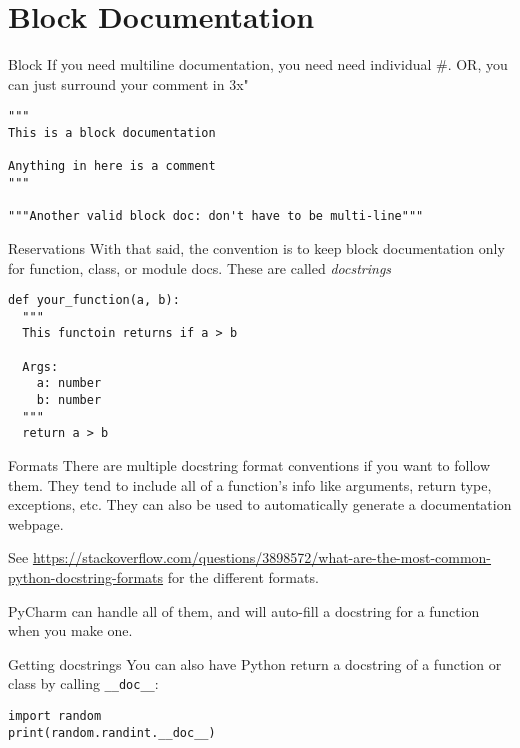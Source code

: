 \section{Block Documentation}
\begin{frame}[containsverbatim]{Block}
If you need multiline documentation, you need need individual \#. OR, you can just surround your comment in 3x"
\begin{verbatim}
"""
This is a block documentation

Anything in here is a comment
"""

"""Another valid block doc: don't have to be multi-line"""
\end{verbatim}
\end{frame}

\begin{frame}[containsverbatim]{Reservations}
With that said, the convention is to keep block documentation only for function, class, or module docs. These are called \textit{docstrings}
\begin{verbatim}
def your_function(a, b):
  """
  This functoin returns if a > b

  Args:
    a: number
    b: number
  """
  return a > b
\end{verbatim}
\end{frame}

\begin{frame}{Formats}
There are multiple docstring format conventions if you want to follow them. They tend to include all of a function's info like arguments, return type, exceptions, etc. They can also be used to automatically generate a documentation webpage.

See \url{https://stackoverflow.com/questions/3898572/what-are-the-most-common-python-docstring-formats} for the different formats.

PyCharm can handle all of them, and will auto-fill a docstring for a function when you make one.
\end{frame}

\begin{frame}[containsverbatim]{Getting docstrings}
You can also have Python return a docstring of a function or class by calling \verb|__doc__|:
\begin{verbatim}
import random
print(random.randint.__doc__)
\end{verbatim}
\end{frame}

